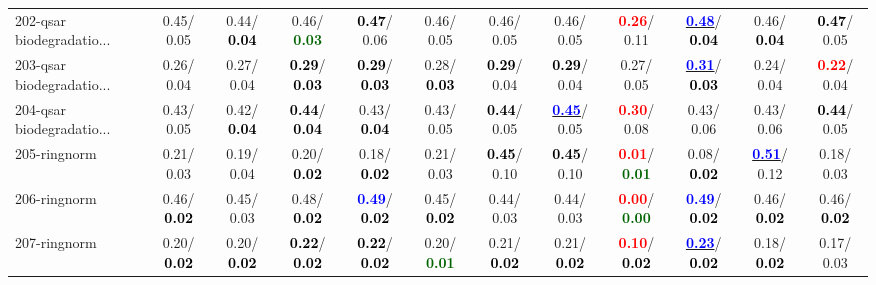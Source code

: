 \begin{table}[h]
\begin{center}
{\begin{tabular}{lc|c|c|c|c|c|c|c|c|c|c}
202-qsar biodegradatio... &   0.45/  0.05 &   0.44/\textcolor{black}{\textbf{  0.04}} &   0.46/\textcolor{darkgreen}{\textbf{  0.03}} & \textcolor{black}{\textbf{  0.47}}/  0.06 &   0.46/  0.05 &   0.46/  0.05 &   0.46/  0.05 & \textcolor{red}{\textbf{  0.26}}/  0.11 & \underline{\textcolor{blue}{\textbf{  0.48}}}/\textcolor{black}{\textbf{  0.04}} &   0.46/\textcolor{black}{\textbf{  0.04}} & \textcolor{black}{\textbf{  0.47}}/  0.05 \\
203-qsar biodegradatio... &   0.26/  0.04 &   0.27/  0.04 & \textcolor{black}{\textbf{  0.29}}/\textcolor{black}{\textbf{  0.03}} & \textcolor{black}{\textbf{  0.29}}/\textcolor{black}{\textbf{  0.03}} &   0.28/\textcolor{black}{\textbf{  0.03}} & \textcolor{black}{\textbf{  0.29}}/  0.04 & \textcolor{black}{\textbf{  0.29}}/  0.04 &   0.27/  0.05 & \underline{\textcolor{blue}{\textbf{  0.31}}}/\textcolor{black}{\textbf{  0.03}} &   0.24/  0.04 & \textcolor{red}{\textbf{  0.22}}/  0.04 \\
204-qsar biodegradatio... &   0.43/  0.05 &   0.42/\textcolor{black}{\textbf{  0.04}} & \textcolor{black}{\textbf{  0.44}}/\textcolor{black}{\textbf{  0.04}} &   0.43/\textcolor{black}{\textbf{  0.04}} &   0.43/  0.05 & \textcolor{black}{\textbf{  0.44}}/  0.05 & \underline{\textcolor{blue}{\textbf{  0.45}}}/  0.05 & \textcolor{red}{\textbf{  0.30}}/  0.08 &   0.43/  0.06 &   0.43/  0.06 & \textcolor{black}{\textbf{  0.44}}/  0.05 \\
205-ringnorm &   0.21/  0.03 &   0.19/  0.04 &   0.20/\textcolor{black}{\textbf{  0.02}} &   0.18/\textcolor{black}{\textbf{  0.02}} &   0.21/  0.03 & \textcolor{black}{\textbf{  0.45}}/  0.10 & \textcolor{black}{\textbf{  0.45}}/  0.10 & \textcolor{red}{\textbf{  0.01}}/\textcolor{darkgreen}{\textbf{  0.01}} &   0.08/\textcolor{black}{\textbf{  0.02}} & \underline{\textcolor{blue}{\textbf{  0.51}}}/  0.12 &   0.18/  0.03 \\
206-ringnorm &   0.46/\textcolor{black}{\textbf{  0.02}} &   0.45/  0.03 &   0.48/\textcolor{black}{\textbf{  0.02}} & \textcolor{blue}{\textbf{  0.49}}/\textcolor{black}{\textbf{  0.02}} &   0.45/\textcolor{black}{\textbf{  0.02}} &   0.44/  0.03 &   0.44/  0.03 & \textcolor{red}{\textbf{  0.00}}/\textcolor{darkgreen}{\textbf{  0.00}} & \textcolor{blue}{\textbf{  0.49}}/\textcolor{black}{\textbf{  0.02}} &   0.46/\textcolor{black}{\textbf{  0.02}} &   0.46/\textcolor{black}{\textbf{  0.02}} \\ \hline
207-ringnorm &   0.20/\textcolor{black}{\textbf{  0.02}} &   0.20/\textcolor{black}{\textbf{  0.02}} & \textcolor{black}{\textbf{  0.22}}/\textcolor{black}{\textbf{  0.02}} & \textcolor{black}{\textbf{  0.22}}/\textcolor{black}{\textbf{  0.02}} &   0.20/\textcolor{darkgreen}{\textbf{  0.01}} &   0.21/\textcolor{black}{\textbf{  0.02}} &   0.21/\textcolor{black}{\textbf{  0.02}} & \textcolor{red}{\textbf{  0.10}}/\textcolor{black}{\textbf{  0.02}} & \underline{\textcolor{blue}{\textbf{  0.23}}}/\textcolor{black}{\textbf{  0.02}} &   0.18/\textcolor{black}{\textbf{  0.02}} &   0.17/  0.03 \\

\end{tabular}}
\end{center}
\end{table}
